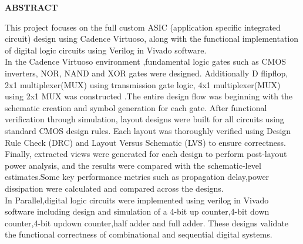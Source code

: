 \documentclass[12pt]{article}
\begin{document}
\begin{center}
\begin{large}
{\bf ABSTRACT}
\end{large}
\end{center}
\vskip 0.2in
This project focuses on the full custom ASIC (application specific integrated circuit) design using Cadence Virtuoso, along with the functional implementation of digital logic circuits using Verilog in Vivado software.\\
In the Cadence Virtuoso environment ,fundamental logic gates such as CMOS inverters, NOR, NAND and XOR gates were designed. Additionally D flipflop, 2x1 multiplexer(MUX) using transmission gate logic, 4x1 multiplexer(MUX) using 2x1 MUX was constructed .The entire design flow was beginning with the schematic creation and symbol generation for each gate. After functional verification through simulation, layout designs were built for all circuits using standard CMOS design rules. Each layout was thoroughly verified using Design Rule Check (DRC) and Layout Versus Schematic (LVS) to ensure correctness. Finally, extracted views were generated for each design to perform post-layout power analysis, and the results were compared with the schematic-level estimates.Some key performance metrics such as propagation delay,power dissipation were calculated and compared across the designs.\\
In Parallel,digital logic circuits were implemented using verilog in Vivado software including design and simulation of a 4-bit up counter,4-bit down counter,4-bit updown counter,half adder and full adder. These designs validate the functional correctness of combinational and sequential digital systems.
\newpage
\tableofcontents
\listoffigures
\listoftables
\newpage
\end{document}
